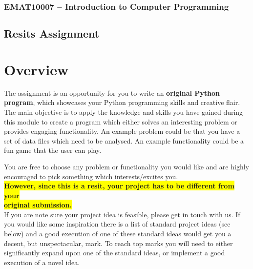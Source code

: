 \documentclass[12pt]{report}
\begin{document}
\subsubsection*{EMAT10007 -- Introduction to Computer Programming}
\subsection*{\Large Resits Assignment }

\section*{Overview}
The assignment is an opportunity for you to write an \textbf{original Python program}, which showcases your Python programming skills and creative flair. The main objective is to apply the knowledge and skills you have gained during this module to create a program which either solves an interesting problem or provides engaging functionality. An example problem could be that you have a set of data files which need to be analysed. An example functionality could be a fun game that the user can play.

\bigskip

You are free to choose any problem or functionality you would like and are highly encouraged to pick something which interests/excites you.
\\
\colorbox{yellow}{\textbf{However, since this is a resit, your project has to be different from your}}
\\
\colorbox{yellow}{\textbf{original submission.}} 
\\
If you are note sure your project idea is feasible, please get in touch with us. If you would like some inspiration there is a list of standard project ideas (see below) and a good execution of one of these standard ideas would get you a decent, but unspectacular, mark. To reach top marks you will need to either significantly expand upon one of the standard ideas, or implement a good execution of a novel idea.
\end{document}
